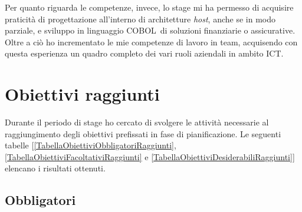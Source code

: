
Per quanto riguarda le competenze, invece, lo stage mi ha permesso di acquisire praticità di progettazione all'interno di architetture \textit{host}, anche se in modo parziale, e sviluppo in linguaggio COBOL\glossario\ di soluzioni finanziarie o assicurative.\\

Oltre a ciò ho incrementato le mie competenze di lavoro in team, acquisendo con questa esperienza un quadro completo dei vari ruoli aziendali in ambito ICT\glossario.


\section{Obiettivi raggiunti}

Durante il periodo di stage ho cercato di svolgere le attività necessarie al raggiungimento degli obiettivi prefissati in fase di pianificazione. Le seguenti tabelle [\ref{TabellaObiettiviObbligatoriRaggiunti}, \ref{TabellaObiettiviFacoltativiRaggiunti} e \ref{TabellaObiettiviDesiderabiliRaggiunti}] elencano i risultati ottenuti.

\subsection{Obbligatori}

